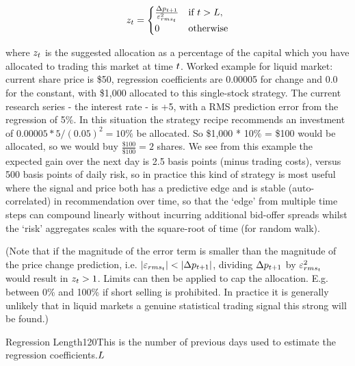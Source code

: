 \documentclass{article}%
\begin{document}
\vspace{1mm}
\begin{equation}
    z_t = 
    \begin{cases}
    \frac{\Delta p_{t+1}}{\varepsilon^{{2}}_{rms_{t}}} & \text{if } t > L,\\
    0                                        & \text{otherwise}
    \end{cases}
\end{equation}



\vspace{1mm}
\justify where $z_t$ is the suggested allocation as a percentage of the capital which you have allocated to trading this market at time $t$.
\justify Worked example for liquid market:  current share price is \$50, regression coefficients are 0.00005 for change and 0.0 for the constant, with \$1,000 allocated to this single-stock strategy.  The current research series - the interest rate - is +5, with a RMS prediction error from the regression of 5\%. In this situation the strategy recipe recommends an investment of $0.00005 * 5 / (0.05)^2 = 10\%$ be allocated. So \$1,000 * 10\% = \$100 would be allocated, so we would buy $\frac{\$100}{\$100} = 2$ shares.
We see from this example the expected gain over the next day is 2.5 basis points (minus trading costs), versus 500 basis points of daily risk, so in practice this kind of strategy is most useful where the signal and price both has a predictive edge and is stable (auto-correlated) in recommendation over time, so that the `edge' from multiple time steps can compound linearly without incurring additional bid-offer spreads whilst the `risk' aggregates scales with the square-root of time (for random walk).


\vspace{1mm}
\justify (Note that if the magnitude of the error term is smaller than the magnitude of the price change prediction, i.e. $|\varepsilon_{rms_{t}}| < |\Delta p_{t+1}|$, dividing $\Delta p_{t+1}$ by $\varepsilon^{{2}}_{rms_{t}}$ would result in $z_t>1$. Limits can then be applied to cap the allocation. E.g. between 0\% and 100\% if short selling is prohibited. In practice it is generally unlikely that in liquid markets a genuine statistical trading signal this strong will be found.)

\vspace{1mm}
{Regression Length}{120}{This is the number of previous days used to estimate the regression coefficients.}{$L$}%
\stoptable 
\end{document}
